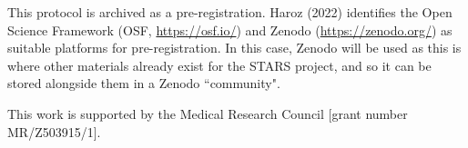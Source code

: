 \vspace{0.5cm}

This protocol is archived as a pre-registration. Haroz (2022)\autocite{haroz_comparison_2022} identifies the Open Science Framework (OSF, \url{https://osf.io/}) and Zenodo (\url{https://zenodo.org/}) as suitable platforms for pre-registration.\autocite{haroz_comparison_2022} In this case, Zenodo will be used as this is where other materials already exist for the STARS project, and so it can be stored alongside them in a Zenodo ``community".

This work is supported by the Medical Research Council [grant number MR/Z503915/1].

\newpage
\tableofcontents